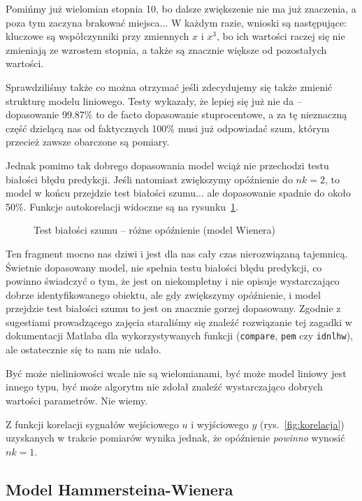 \documentclass[11pt, a4paper]{article}
\begin{document}
Pomińmy już wielomian stopnia 10, bo dalsze zwiększenie nie ma już znaczenia, a poza tym zaczyna brakować miejsca... W każdym razie, wnioski są następujące: kluczowe są współczynniki przy zmiennych $x$ i $x^3$, bo ich wartości raczej się nie zmieniają ze wzrostem stopnia, a także są znacznie większe od pozostałych wartości.

Sprawdziliśmy także co można otrzymać jeśli zdecydujemy się także zmienić strukturę modelu liniowego. Testy wykazały, że lepiej się już nie da -- dopasowanie 99.87\% to de facto dopasowanie stuprocentowe, a za tę nieznaczną część dzielącą nas od faktycznych 100\% musi już odpowiadać szum, którym przecież zawsze obarczone są pomiary.

Jednak pomimo tak dobrego dopasowania model wciąż nie przechodzi testu białości błędu predykcji. Jeśli natomiast zwiększymy opóźnienie do $nk = 2$, to model w końcu przejdzie test białości szumu... ale dopasowanie spadnie do około 50\%. Funkcje autokorelacji widoczne są na rysunku~\ref{fig:bialy2}.
\begin{figure}[htbp!]
	\centering
	\hfill%
	\caption{Test białości szumu -- różne opóźnienie (model Wienera)}
	\label{fig:bialy2}
\end{figure}

Ten fragment mocno nas dziwi i jest dla nas cały czas nierozwiązaną tajemnicą. Świetnie dopasowany model, nie spełnia testu białości błędu predykcji, co powinno świadczyć o tym, że jest on niekompletny i nie opisuje wystarczająco dobrze identyfikowanego obiektu, ale gdy zwiększymy opóźnienie, i model przejdzie test białości szumu to jest on znacznie gorzej dopasowany. Zgodnie z sugestiami prowadzącego zajęcia staraliśmy się znaleźć rozwiązanie tej zagadki w dokumentacji Matlaba dla wykorzystywanych funkcji (\texttt{compare}, \texttt{pem} czy \texttt{idnlhw}), ale ostatecznie się to nam nie udało.

Być może nieliniowości wcale nie są wielomianami, być może model liniowy jest innego typu, być może algorytm nie zdołał znaleźć wystarczająco dobrych wartości parametrów. Nie wiemy.

Z funkcji korelacji sygnałów wejściowego $u$ i wyjściowego $y$ (rys.~\ref{fig:korelacja}) uzyskanych w trakcie pomiarów wynika jednak, że opóźnienie \emph{powinno} wynosić $nk = 1$.

\subsection*{Model Hammersteina-Wienera}
\end{document}
